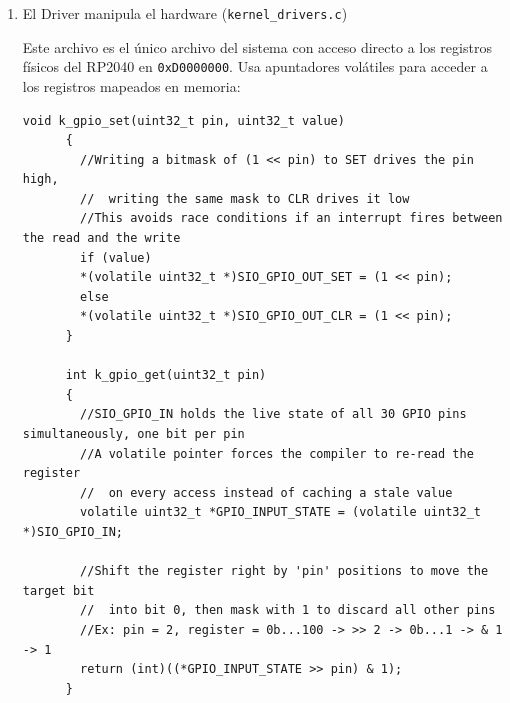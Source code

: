 \documentclass[12pt,letterpaper]{article}
\begin{document}
\begin{enumerate}[label=Paso \arabic*.]
\begin{lstlisting}[style=modernc]
          case SYS_GPIO_DIR:
          // Validate before executing.
          // Example: Prohibit touching pins 0 and 1 (UART) or pins > 28 (System)
          int pin = svc_args[0];
          if (pin < 2 || pin > 28) {
            svc_args[0] = -1; // Error: Permission denied (EACCES)
          } else {
            //Pin is within the safe range
            //Initialize direction via the driver and return 0 as signal success back to user space through r0
            k_gpio_init(svc_args[0], svc_args[1]);
            svc_args[0] = 0; //success
          }
          break;
          
          default:
          // Invalid syscall ID, return an error code (e.g., -1)
          svc_args[0] = -1; 
          break;
        }
      }
  \end{lstlisting}
  
  La línea \texttt{svc\_args[0] = resultado} es la forma en que el kernel retorna un valor al usuario. Como \texttt{svc\_args[0]} apunta exactamente a donde está $r0$ guardado en el stack, al modificarlo el procesador restaurará ese valor en $r0$ cuando regrese al modo usuario.

\item El Driver manipula el hardware (\texttt{kernel\_drivers.c})
  
  Este archivo es el único archivo del sistema con acceso directo a los registros físicos del RP2040 en \texttt{0xD0000000}. Usa apuntadores volátiles para acceder a los registros mapeados en memoria:
  
  \begin{lstlisting}[style=modernc]
    void k_gpio_set(uint32_t pin, uint32_t value)
      {
        //Writing a bitmask of (1 << pin) to SET drives the pin high,
        //  writing the same mask to CLR drives it low
        //This avoids race conditions if an interrupt fires between the read and the write
        if (value)
        *(volatile uint32_t *)SIO_GPIO_OUT_SET = (1 << pin);
        else
        *(volatile uint32_t *)SIO_GPIO_OUT_CLR = (1 << pin);
      }
      
      int k_gpio_get(uint32_t pin)
      {
        //SIO_GPIO_IN holds the live state of all 30 GPIO pins simultaneously, one bit per pin
        //A volatile pointer forces the compiler to re-read the register
        //  on every access instead of caching a stale value
        volatile uint32_t *GPIO_INPUT_STATE = (volatile uint32_t *)SIO_GPIO_IN;
        
        //Shift the register right by 'pin' positions to move the target bit
        //  into bit 0, then mask with 1 to discard all other pins
        //Ex: pin = 2, register = 0b...100 -> >> 2 -> 0b...1 -> & 1 -> 1
        return (int)((*GPIO_INPUT_STATE >> pin) & 1);
      }
  \end{lstlisting}
  

\end{enumerate}
\end{document}
